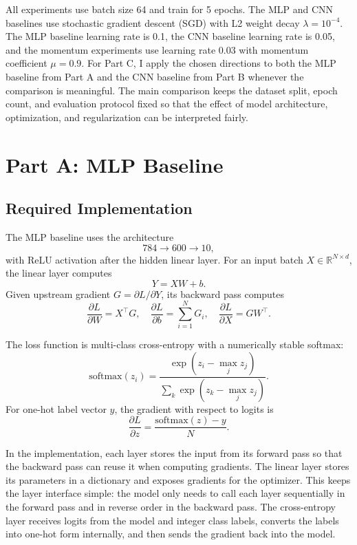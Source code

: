 \documentclass[11pt]{article}
\begin{document}
All experiments use batch size 64 and train for 5 epochs. The MLP and CNN baselines use stochastic gradient descent (SGD) with L2 weight decay $\lambda=10^{-4}$. The MLP baseline learning rate is 0.1, the CNN baseline learning rate is 0.05, and the momentum experiments use learning rate 0.03 with momentum coefficient $\mu=0.9$. For Part C, I apply the chosen directions to both the MLP baseline from Part A and the CNN baseline from Part B whenever the comparison is meaningful. The main comparison keeps the dataset split, epoch count, and evaluation protocol fixed so that the effect of model architecture, optimization, and regularization can be interpreted fairly.

\section{Part A: MLP Baseline}

\subsection{Required Implementation}

The MLP baseline uses the architecture
\[
784 \rightarrow 600 \rightarrow 10,
\]
with ReLU activation after the hidden linear layer. For an input batch $X \in \mathbb{R}^{N \times d}$, the linear layer computes
\[
Y = XW + b.
\]
Given upstream gradient $G=\partial L/\partial Y$, its backward pass computes
\[
\frac{\partial L}{\partial W}=X^\top G,\quad
\frac{\partial L}{\partial b}=\sum_{i=1}^{N}G_i,\quad
\frac{\partial L}{\partial X}=GW^\top.
\]

The loss function is multi-class cross-entropy with a numerically stable softmax:
\[
\mathrm{softmax}(z_i)=\frac{\exp(z_i-\max_j z_j)}{\sum_k \exp(z_k-\max_j z_j)}.
\]
For one-hot label vector $y$, the gradient with respect to logits is
\[
\frac{\partial L}{\partial z}=\frac{\mathrm{softmax}(z)-y}{N}.
\]

In the implementation, each layer stores the input from its forward pass so that the backward pass can reuse it when computing gradients. The linear layer stores its parameters in a dictionary and exposes gradients for the optimizer. This keeps the layer interface simple: the model only needs to call each layer sequentially in the forward pass and in reverse order in the backward pass. The cross-entropy layer receives logits from the model and integer class labels, converts the labels into one-hot form internally, and then sends the gradient back into the model.
\end{document}
